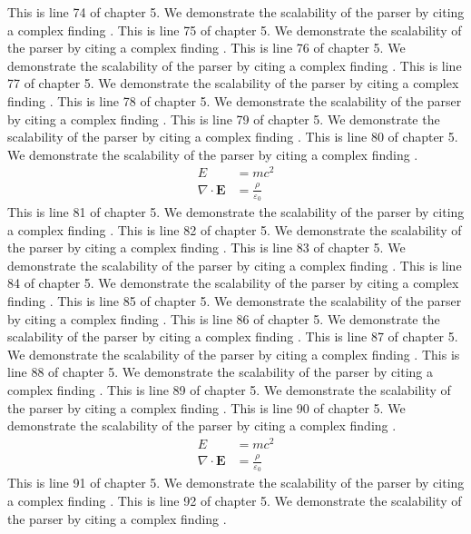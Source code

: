 This is line 74 of chapter 5. We demonstrate the scalability of the parser by citing a complex finding \cite{ref5_74}.
This is line 75 of chapter 5. We demonstrate the scalability of the parser by citing a complex finding \cite{ref5_75}.
This is line 76 of chapter 5. We demonstrate the scalability of the parser by citing a complex finding \cite{ref5_76}.
This is line 77 of chapter 5. We demonstrate the scalability of the parser by citing a complex finding \cite{ref5_77}.
This is line 78 of chapter 5. We demonstrate the scalability of the parser by citing a complex finding \cite{ref5_78}.
This is line 79 of chapter 5. We demonstrate the scalability of the parser by citing a complex finding \cite{ref5_79}.
This is line 80 of chapter 5. We demonstrate the scalability of the parser by citing a complex finding \cite{ref5_80}.
\begin{align*}
  E &= mc^2 \\
  \nabla \cdot \mathbf{E} &= \frac{\rho}{\varepsilon_0}
\end{align*}
This is line 81 of chapter 5. We demonstrate the scalability of the parser by citing a complex finding \cite{ref5_81}.
This is line 82 of chapter 5. We demonstrate the scalability of the parser by citing a complex finding \cite{ref5_82}.
This is line 83 of chapter 5. We demonstrate the scalability of the parser by citing a complex finding \cite{ref5_83}.
This is line 84 of chapter 5. We demonstrate the scalability of the parser by citing a complex finding \cite{ref5_84}.
This is line 85 of chapter 5. We demonstrate the scalability of the parser by citing a complex finding \cite{ref5_85}.
This is line 86 of chapter 5. We demonstrate the scalability of the parser by citing a complex finding \cite{ref5_86}.
This is line 87 of chapter 5. We demonstrate the scalability of the parser by citing a complex finding \cite{ref5_87}.
This is line 88 of chapter 5. We demonstrate the scalability of the parser by citing a complex finding \cite{ref5_88}.
This is line 89 of chapter 5. We demonstrate the scalability of the parser by citing a complex finding \cite{ref5_89}.
This is line 90 of chapter 5. We demonstrate the scalability of the parser by citing a complex finding \cite{ref5_90}.
\begin{align*}
  E &= mc^2 \\
  \nabla \cdot \mathbf{E} &= \frac{\rho}{\varepsilon_0}
\end{align*}
This is line 91 of chapter 5. We demonstrate the scalability of the parser by citing a complex finding \cite{ref5_91}.
This is line 92 of chapter 5. We demonstrate the scalability of the parser by citing a complex finding \cite{ref5_92}.
